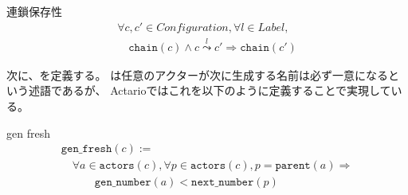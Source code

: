 \begin{lemma}{連鎖保存性}
\begin{displaymath}
  \begin{array}{l}
    \forall c, c' \in \textit{Configuration}, \forall l \in \textit{Label}, \\
    \quad \texttt{chain}(c) \wedge c \overset{l}{\leadsto} c' \Rightarrow \texttt{chain}(c')
  \end{array}
\end{displaymath}
\end{lemma}


次に、を定義する。
は任意のアクターが次に生成する名前は必ず一意になるという述語であるが、
Actarioではこれを以下のように定義することで実現している。

\begin{definition}{gen fresh}
\begin{displaymath}
  \begin{array}{l}
    \texttt{gen\_fresh}(c) := \\
    \quad \forall a \in \texttt{actors}(c), \forall p \in \texttt{actors}(c), p = \texttt{parent}(a) \Rightarrow \\
    \quad \quad \quad \texttt{gen\_number}(a) < \texttt{next\_number}(p)
  \end{array}
\end{displaymath}
\end{definition}


